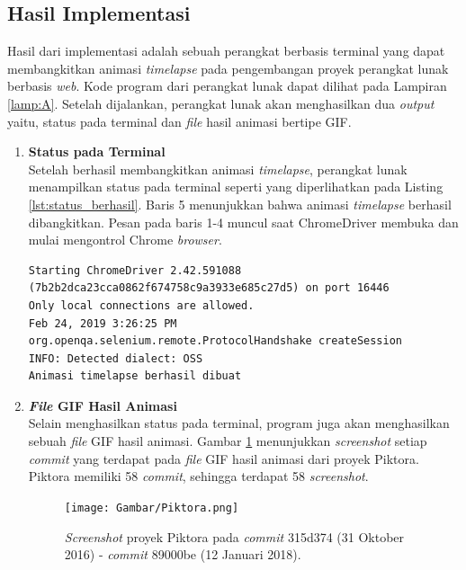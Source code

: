 \subsection{Hasil Implementasi}
\label{subsec:lingkunganimplementasi}
Hasil dari implementasi adalah sebuah perangkat berbasis terminal yang dapat membangkitkan animasi \textit{timelapse} pada pengembangan proyek perangkat lunak berbasis \textit{web}. Kode program dari perangkat lunak dapat dilihat pada Lampiran \ref{lamp:A}. Setelah dijalankan, perangkat lunak akan menghasilkan dua \textit{output} yaitu, status pada terminal dan \textit{file} hasil animasi bertipe GIF.
\begin{enumerate}
\item \textbf{Status pada Terminal}\\
Setelah berhasil membangkitkan animasi \textit{timelapse}, perangkat lunak menampilkan status pada terminal seperti yang diperlihatkan pada Listing \ref{lst:status_berhasil}. Baris 5 menunjukkan bahwa animasi \textit{timelapse} berhasil dibangkitkan. Pesan pada baris 1-4 muncul saat ChromeDriver membuka dan mulai mengontrol Chrome \textit{browser}.

\begin{lstlisting}[caption={Status pesan pada terminal saat program berhasil membangkitkan animasi \textit{timelapse}.},label={lst:status_berhasil},language=plaintext]
Starting ChromeDriver 2.42.591088 (7b2b2dca23cca0862f674758c9a3933e685c27d5) on port 16446
Only local connections are allowed.
Feb 24, 2019 3:26:25 PM org.openqa.selenium.remote.ProtocolHandshake createSession
INFO: Detected dialect: OSS
Animasi timelapse berhasil dibuat
\end{lstlisting}

\item \textbf{\textit{File} GIF Hasil Animasi}\\
Selain menghasilkan status pada terminal, program juga akan menghasilkan sebuah \textit{file} GIF hasil animasi.
Gambar \ref{fig:c1} menunjukkan \textit{screenshot} setiap \textit{commit} yang terdapat pada \textit{file} GIF hasil animasi dari proyek Piktora. Piktora memiliki 58 \textit{commit}, sehingga terdapat 58 \textit{screenshot}. 


\begin{figure}[H]
	
		\texttt{[image: Gambar/Piktora.png]}
	\caption{\textit{Screenshot} proyek Piktora pada \textit{commit} 315d374 (31 Oktober 2016) - \textit{commit} 89000be (12 Januari 2018).}
	\label{fig:c1}
\end{figure}





\end{enumerate}
